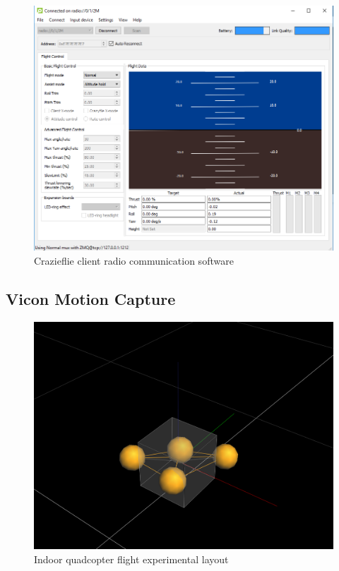 \documentclass[numbered,pdftex]{ohio-etd}
\begin{document}
\begin{figure}[H]
	\centering
	\includegraphics[trim=0 0 0 0,clip,width=12cm]{PaperFigures/Methods/cfClient}
	\caption{Crazieflie client radio communication software}
	\label{fig:cfClient}
\end{figure}


\subsection{Vicon Motion Capture}

\begin{figure}
	\centering
	\includegraphics[trim=20 100 100 100,clip,width=12cm]{PaperFigures/Methods/viconObject}
	\caption{Indoor quadcopter flight experimental layout}
	\label{fig:viconObject}
\end{figure}
\end{document}
